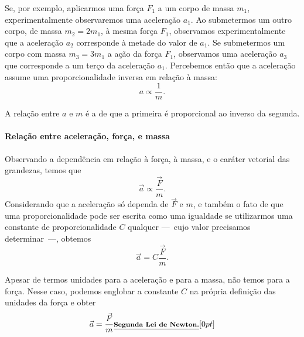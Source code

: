 Se, por exemplo, aplicarmos uma força $F_1$ a um corpo de massa $m_1$, experimentalmente observaremos uma aceleração $a_1$. Ao submetermos um outro corpo, de massa $m_2 = 2 m_1$, à mesma força $F_1$, observamos experimentalmente que a aceleração $a_2$ corresponde à metade do valor de $a_1$. Se submetermos um corpo com massa $m_3 = 3 m_1$ a ação da força $F_1$, observamos uma aceleração $a_3$ que corresponde a um terço da aceleração $a_1$. Percebemos então que a aceleração assume uma proporcionalidade inversa em relação à massa:
\begin{equation}
  a \propto \frac{1}{m}.
\end{equation}

\begin{marginfigure}
\centering
{}
\caption{A relação entre $a$ e $m$ é a de que a primeira é proporcional ao inverso da segunda.}
\end{marginfigure}

\paragraph{Relação entre aceleração, força, e massa}

Observando a dependência em relação à força, à massa, e o caráter vetorial das grandezas, temos que
\begin{equation}
  \vec{a} \propto \frac{\vec{F}}{m}.
\end{equation}
%
Considerando que a aceleração só dependa de $\vec{F}$ e $m$, e também o fato de que uma proporcionalidade pode ser escrita como uma igualdade se utilizarmos uma constante de proporcionalidade $C$ qualquer ---~cujo valor precisamos determinar~---, obtemos
\begin{equation}
  \vec{a} = C \frac{\vec{F}}{m}.
\end{equation}

Apesar de termos unidades para a aceleração e para a massa, não temos para a força. Nesse caso, podemos englobar a constante $C$ na própria definição das unidades da força e obter
\begin{equation}\label{Eq:SegundaLeiDeNewton}
  \vec{a} = \frac{\vec{F}}{m} \relax{\footnotesize\emph{\textbf{Segunda Lei de Newton.}}}[0pt]
\end{equation}

